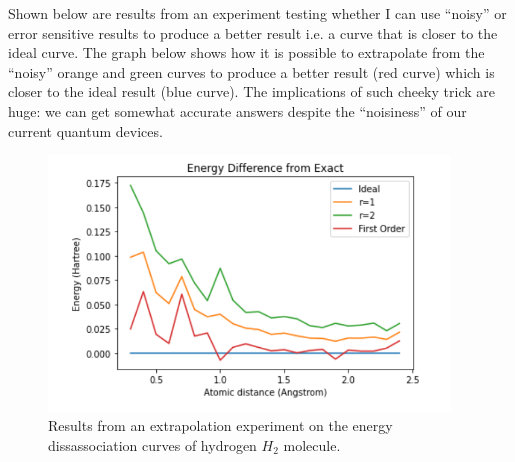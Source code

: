 \documentclass{article}
\begin{document}
\begin{itemize}
\begin{itemize}
  Shown below are results from an experiment testing whether I can use ``noisy''
  or error sensitive results to produce a better result i.e. a curve that
  is closer to the ideal curve. The graph below shows how it is possible to
  extrapolate from the ``noisy'' orange and green curves to produce a better
  result (red curve) which is closer to the ideal result (blue curve). The
  implications of such cheeky trick are huge: we can get somewhat accurate answers
  despite the ``noisiness'' of our current quantum devices.
  \begin{figure}[!htb]
	\centering
	\includegraphics[width=0.95\textwidth]{img/JournalTwo-f5cc5222.png}
	\caption{Results from an extrapolation experiment on the energy dissassociation
  curves of hydrogen \(H_2\) molecule.}
	\label{}
\end{figure}
\end{itemize}

\end{itemize}
\end{document}

